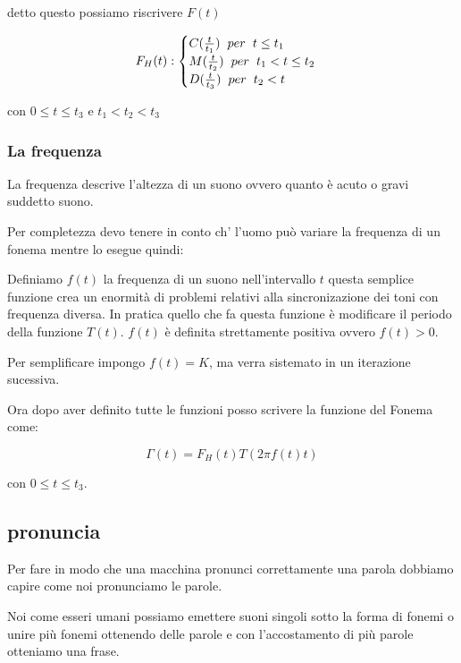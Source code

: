\documentclass{article}
\begin{document}
detto questo possiamo riscrivere $F(t)$

$$F_H(t) : 
\begin{cases}
    C(\frac{t}{t_1}) \hspace{0.2cm}per\hspace{0.2cm} t \le t_1 \\
    M(\frac{t}{t_2}) \hspace{0.2cm}per\hspace{0.2cm} t_1 < t \le t_2\\
    D(\frac{t}{t_3}) \hspace{0.2cm}per\hspace{0.2cm} t_2 < t 
\end{cases}
$$

con $0 \le t \le t_3$ e $t_1 < t_2 < t_3$

\subsubsection{La frequenza}
La frequenza descrive l'altezza di un suono ovvero quanto è acuto o gravi suddetto suono.

Per completezza devo tenere in conto ch' l'uomo può variare la frequenza di un fonema mentre lo esegue quindi:

Definiamo $f(t)$ la frequenza di un suono nell'intervallo $t$ questa semplice funzione crea un enormità di problemi relativi alla sincronizazione dei toni con frequenza diversa.
In pratica quello che fa questa funzione è modificare il periodo della funzione $T(t)$. $f(t)$ è definita strettamente positiva ovvero $f(t) > 0$.

Per semplificare impongo $f(t) = K$, ma verra sistemato in un iterazione sucessiva.

Ora dopo aver definito tutte le funzioni posso scrivere la funzione del Fonema come:

$$\Gamma(t) = F_H(t) T(2\pi f(t) t)$$

con $0 \le t \le t_3$.

\subsection{pronuncia}
Per fare in modo che una macchina pronunci correttamente una parola dobbiamo capire come noi pronunciamo le parole.

Noi come esseri umani possiamo emettere suoni singoli sotto la forma di fonemi o unire più fonemi ottenendo delle parole e con l'accostamento di più parole otteniamo una frase.
\end{document}
